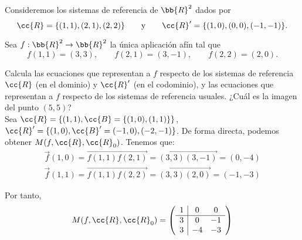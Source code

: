 \begin{ejercicio}
    Consideremos los sistemas de referencia de $\bb{R}^2$ dados por
    \begin{equation*}
        \cc{R} = \{(1, 1), (2, 1), (2, 2)\}
        \qquad \text{y} \qquad
        \cc{R}' = \{(1, 0), (0, 0), (-1, -1)\}.
    \end{equation*}

    Sea $f:\bb{R}^2\to \bb{R}^2$ la única aplicación afín tal que
    \begin{equation*}
        f (1, 1) = (3, 3),\qquad f (2, 1) = (3, -1),\qquad f (2, 2) = (2, 0).
    \end{equation*}

    Calcula las ecuaciones que representan a $f$ respecto de los sistemas de referencia $\cc{R}$ (en el dominio) y $\cc{R}'$ (en el codominio), y las ecuaciones que representan a $f$ respecto de los sistemas de referencia usuales. ¿Cuál es la imagen del punto $(5, 5)$?\\

    Sea $\cc{R}=\{(1,1),\cc{B}=\{(1,0), (1,1)\}\}$, $\cc{R}'=\{(1,0), \cc{B}'=(-1,0), (-2, -1)\}$. De forma directa, podemos obtener $M(f,\cc{R},\cc{R}_0)$. Tenemos que:
    \begin{gather*}
        \vec{f}(1,0) = \vec{f(1,1)f(2,1)} = \vec{(3,3)(3,-1)} = (0,-4)\\
        \vec{f}(1,1) = \vec{f(1,1)f(2,2)} = \vec{(3,3)(2,0)} = (-1,-3)
    \end{gather*}

    Por tanto,
    \begin{equation*}
        M(f,\cc{R},\cc{R}_0) = 
        \left(\begin{array}{c|cc}
            1 & 0 & 0 \\ \hline
            3 & 0 & -1\\
            3 & -4 & -3
        \end{array}\right)
    \end{equation*}


\end{ejercicio}
